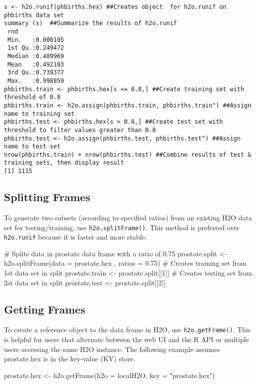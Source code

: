 \begin{lstlisting}[breaklines,basicstyle=\ttfamily]
s <- h2o.runif(phbirths.hex) ##Creates object  for h2o.runif on phbirths data set
summary (s)  ##Summarize the results of h2o.runif
 rnd               
 Min.   :0.000105  
 1st Qu.:0.249472  
 Median :0.489969  
 Mean   :0.492103  
 3rd Qu.:0.739377  
 Max.   :0.998859  
phbirths.train <- phbirths.hex[s <= 0.8,] ##Create training set with threshold of 0.8
phbirths.train <- h2o.assign(phbirths.train, phbirths.train") ##Assign name to training set
phbirths.test <- phbirths.hex[s > 0.8,] ##Create test set with threshold to filter values greater than 0.8
phbirths.test <- h2o.assign(phbirths.test, phbirths.test") ##Assign name to test set
nrow(phbirths.train) + nrow(phbirths.test) ##Combine results of test & training sets, then display result
[1] 1115
\end{lstlisting}
 

\subsection{Splitting Frames}

To generate two subsets (according to specified ratios) from an existing H2O data set for testing/training, use {\texttt{h2o.splitFrame()}}.  This method is preferred over {\texttt{h2o.runif}} because it is faster and more stable. 

\begin{spverbatim}
# Splits data in prostate data frame with a ratio of 0.75
prostate.split <- h2o.splitFrame(data = prostate.hex , ratios = 0.75)
# Creates training set from 1st data set in split
prostate.train <- prostate.split[[1]] 
# Creates testing set from 2st data set in split
prostate.test <- prostate.split[[2]]
\end{spverbatim}


\subsection{Getting Frames}

To create a reference object to the data frame in H2O, use {\texttt{h2o.getFrame()}}. This is helpful for  users that alternate between the web UI and the R API or multiple users accessing the same H2O instance. The following example assumes prostate.hex is in the key-value (KV) store.

\begin{spverbatim}
prostate.hex <- h2o.getFrame(h2o = localH2O, key = "prostate.hex")
\end{spverbatim}


